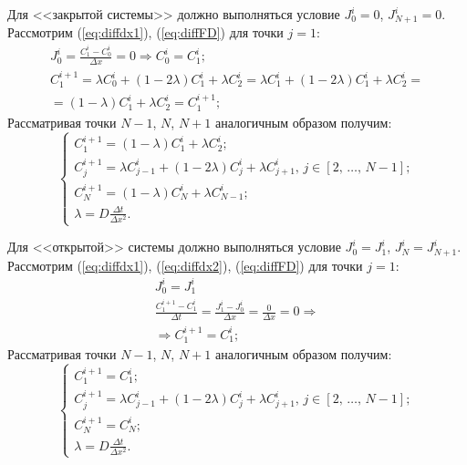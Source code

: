 Для <<закрытой системы>> должно выполняться условие $J_{0}^{i} = 0$, $J_{N+1}^{i} = 0$. Рассмотрим (\ref{eq:diffdx1}), (\ref{eq:diffFD}) для точки $j = 1$:
\begin{gather*}
 	J^{i}_{0} = \frac{C^{i}_{1} - C^{i}_{0}}{\Delta x} = 0 \Rightarrow C_{0}^{i} = C_{1}^{i};\\
	C^{i+1}_{1} = \lambda C^{i}_{0} + (1 - 2\lambda)C^{i}_{1} + \lambda C^{i}_{2} = \lambda C^{i}_{1} + (1 - 2\lambda)C^{i}_{1} + \lambda C^{i}_{2} = \\
	= (1 - \lambda)C^{i}_{1} + \lambda C^{i}_{2} = C^{i+1}_{1};
\end{gather*}
Рассматривая точки $N-1$, $N$, $N+1$ аналогичным образом получим:
\begin{equation}
	\begin{cases}
		C^{i+1}_{1} = (1 - \lambda)C^{i}_{1} + \lambda C^{i}_{2};\\
		C^{i+1}_{j} = \lambda C^{i}_{j-1} + (1 - 2\lambda)C^{i}_{j} + \lambda C^{i}_{j+1},\,j \in [2,\,\dots,\,N-1];\\
		C^{i+1}_{N} = (1 - \lambda)C^{i}_{N} + \lambda C^{i}_{N-1};\\
		\lambda = D\frac{\Delta t}{\Delta x^{2}}.
	\end{cases}
\end{equation}

Для <<открытой>> системы должно выполняться условие $J_{0}^{i} = J_{1}^{i}$, $J_{N}^{i} = J_{N+1}^{i}$. Рассмотрим (\ref{eq:diffdx1}), (\ref{eq:diffdx2}), (\ref{eq:diffFD}) для точки $j = 1$:
\begin{gather*}
 	J^{i}_{0} = J^{i}_{1}\\
	\frac{C^{i+1}_{1} - C^{i}_{1}}{\Delta t} = \frac{J^{i}_{1} - J^{i}_{0}}{\Delta x} = \frac{0}{\Delta x} = 0\Rightarrow\\
	\Rightarrow C^{i+1}_{1} = C^{i}_{1};
\end{gather*}
Рассматривая точки $N-1$, $N$, $N+1$ аналогичным образом получим:
\begin{equation}
	\label{eq:DDiffConst}
	\begin{cases}
		C^{i+1}_{1} = C^{i}_{1};\\
		C^{i+1}_{j} = \lambda C^{i}_{j-1} + (1 - 2\lambda)C^{i}_{j} + \lambda C^{i}_{j+1},\,j \in [2,\,\dots,\,N-1];\\
		C^{i+1}_{N} = C^{i}_{N};\\
		\lambda = D\frac{\Delta t}{\Delta x^{2}}.
	\end{cases}
\end{equation}

